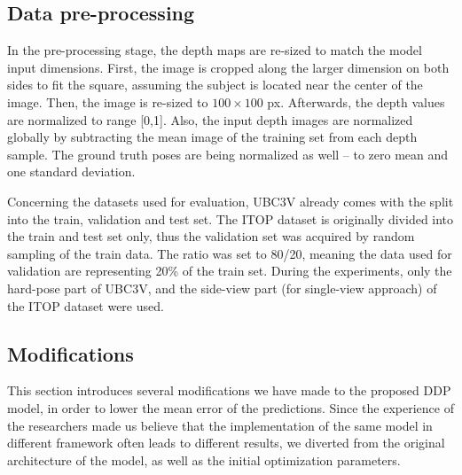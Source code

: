 \subsection{Data pre-processing}

In the pre-processing stage, the depth maps are re-sized to match the model input dimensions. First, the image is cropped along the larger dimension on both sides to fit the square, assuming the subject is located near the center of the image. Then, the image is re-sized to $100\times100$ px. Afterwards, the depth values are normalized to range [0,1]. Also, the input depth images are normalized globally by subtracting the mean image of the training set from each depth sample. The ground truth poses are being normalized as well – to zero mean and one standard deviation.\par
\vspace{5mm}
\noindent 
Concerning the datasets used for evaluation, UBC3V already comes with the split into the train, validation and test set. The ITOP dataset is originally divided into the train and test set only, thus the validation set was acquired by random sampling of the train data. The ratio was set to 80/20, meaning the data used for validation are representing 20\% of the train set. During the experiments, only the hard-pose part of UBC3V, and the side-view part (for single-view approach) of the ITOP dataset were used.

%

\subsection{Modifications}
This section introduces several modifications we have made to the proposed DDP model, in order to lower the mean error of the predictions. Since the experience of the researchers made us believe that the implementation of the same model in different framework often leads to different results, we diverted from the original architecture of the model, as well as the initial optimization parameters.\par
\vspace{5mm}

